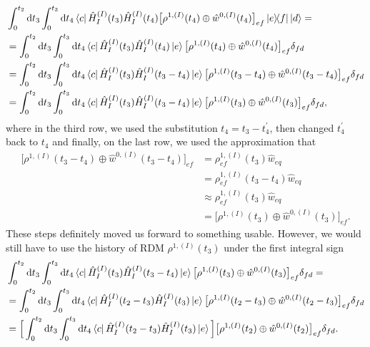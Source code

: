 \begin{equation}
    \begin{aligned}
    &\int_{0}^{t_2} \mathrm{d} t_3 \int_{0}^{t_3} \mathrm{d} t_4 \bra{c}\hat{H}_{I}^{(I)}(t_3) \hat{H}_{I}^{(I)}(t_4) \big[\rho^{1, (I)}(t_4) \oplus \hat{w}^{0, (I)}(t_4)\big]_{ef} \ketbra{e}{f} \ket{d}  = \\
    &= \int_{0}^{t_2} \mathrm{d} t_3 \int_{0}^{t_3} \mathrm{d} t_4 \bra{c}\hat{H}_{I}^{(I)}(t_3) \hat{H}_{I}^{(I)}(t_4) \ket{e}\big[\rho^{1, (I)}(t_4) \oplus \hat{w}^{0, (I)}(t_4)\big]_{ef} \delta_{fd} \\
    &= \int_{0}^{t_2} \mathrm{d} t_3 \int_{0}^{t_3} \mathrm{d} t_4 \bra{c}\hat{H}_{I}^{(I)}(t_3) \hat{H}_{I}^{(I)}(t_3 - t_4) \ket{e}\big[\rho^{1, (I)}(t_3 - t_4) \oplus \hat{w}^{0, (I)}(t_3 - t_4)\big]_{ef} \delta_{fd} \\
    &= \int_{0}^{t_2} \mathrm{d} t_3 \int_{0}^{t_3} \mathrm{d} t_4 \bra{c}\hat{H}_{I}^{(I)}(t_3) \hat{H}_{I}^{(I)}(t_3 - t_4) \ket{e}\big[\rho^{1, (I)}(t_3) \oplus \hat{w}^{0, (I)}(t_3)\big]_{ef} \delta_{fd}, \\
    \end{aligned} 
\end{equation}
where in the third row, we used the substitution $t_4 = t_3 - t_4^\prime$, then changed $t_4^\prime$ back to $t_4$ and finally, on the last row, we used the approximation that 
\begin{equation}
    \begin{aligned}
    \big[\rho^{1, (I)}(t_3 - t_4) \oplus \hat{w}^{0, (I)}(t_3 - t_4)\big]_{ef} &= \rho^{1, (I)}_{ef}(t_3) \hat{w}_{eq}  \\
    &= \rho^{1, (I)}_{ef}(t_3 - t_4) \hat{w}_{eq} \\
    &\approx \rho^{1, (I)}_{ef}(t_3) \hat{w}_{eq} \\
    &= \big[\rho^{1, (I)}(t_3) \oplus \hat{w}^{0, (I)}(t_3)\big]_{ef}.
    \end{aligned} 
\end{equation}
These steps definitely moved us forward to something usable. However, we would still have to use the history of RDM $\rho^{1, (I)}(t_3)$ under the first integral sign
\begin{equation}
    \begin{aligned}
    &\int_{0}^{t_2} \mathrm{d} t_3 \int_{0}^{t_3} \mathrm{d} t_4 \bra{c}\hat{H}_{I}^{(I)}(t_3) \hat{H}_{I}^{(I)}(t_3 - t_4) \ket{e}\big[\rho^{1, (I)}(t_3) \oplus \hat{w}^{0, (I)}(t_3)\big]_{ef} \delta_{fd} = \\
    &= \int_{0}^{t_2} \mathrm{d} t_3 \int_{0}^{t_3} \mathrm{d} t_4 \bra{c}\hat{H}_{I}^{(I)}(t_2 - t_3) \hat{H}_{I}^{(I)}(t_3) \ket{e}\big[\rho^{1, (I)}(t_2 - t_3) \oplus \hat{w}^{0, (I)}(t_2 - t_3)\big]_{ef} \delta_{fd} \\
    &= \Big[\int_{0}^{t_2} \mathrm{d} t_3 \int_{0}^{t_3} \mathrm{d} t_4 \bra{c}\hat{H}_{I}^{(I)}(t_2 - t_3) \hat{H}_{I}^{(I)}(t_3) \ket{e} \Big]\big[\rho^{1, (I)}(t_2) \oplus \hat{w}^{0, (I)}(t_2)\big]_{ef} \delta_{fd}. \\
    \end{aligned} 
\end{equation}
